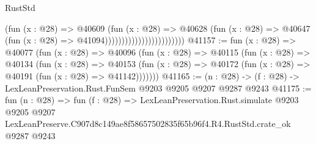 \begin{lexlean}{RustStd}
\begin{coremodule}
                                            (fun (x : @28) =>
                                            @40609
                                              (fun (x : @28) =>
                                              @40628
                                                (fun (x : @28) =>
                                                @40647
                                                  (fun (x : @28) => @41094))))))))))))))))))))))))
@41157 := fun (x : @28) =>
  @40077
    (fun (x : @28) =>
    @40096
      (fun (x : @28) =>
      @40115
        (fun (x : @28) =>
        @40134
          (fun (x : @28) =>
          @40153 (fun (x : @28) => @40172 (fun (x : @28) => @40191 (fun (x : @28) => @41142)))))))
@41165 := (n : @28) -> (f : @28) -> LexLeanPreservation.Rust.FunSem @9203 @9205 @9207 @9287 @9243
@41175 := fun (n : @28) =>
  fun (f : @28) =>
  LexLeanPreservation.Rust.simulate
    @9203
    @9205
    @9207
    LexLeanPreserve.C907d8c149ae8f58657502835f65b96f4.R4.RustStd.crate_ok
    @9287
    @9243
\end{coremodule}
\end{lexlean}
